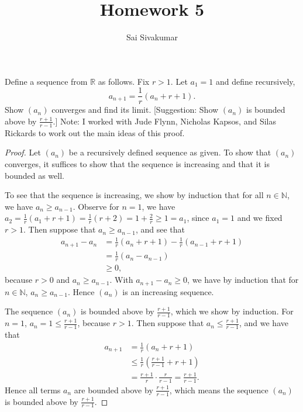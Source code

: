 \documentclass[12pt]{amsart}
\title{Homework 5}
\author{Sai Sivakumar}
\begin{document}
\maketitle

  Define a sequence from $\mathbb R$ as follows.
  Fix $r>1$. Let $a_1=1$ and define recursively, 
\[
  a_{n+1} = \frac{1}{r}(a_n +r +1).
\]
 Show $(a_n)$ converges and find its limit.
[Suggestion: Show $(a_n)$ is bounded above by $\frac{r+1}{r-1}.$]
Note: I worked with Jude Flynn, Nicholas Kapsos, and Silas Rickards to work out the main ideas of this proof.

\begin{proof}
    Let $(a_n)$ be a recursively defined sequence as given. To show that $(a_n)$ converges, it suffices to show that the sequence is increasing and that it is bounded as well.

    To see that the sequence is increasing, we show by induction that for all $n\in\mathbb{N}$, we have $a_{n} \geq a_{n-1}$. Observe for $n=1$, we have $a_2 = \frac{1}{r}(a_1 +r+1) = \frac{1}{r}(r+2) = 1 + \frac{2}{r} \geq 1 = a_1$, since $a_1 = 1$ and we fixed $r>1$. Then suppose that $a_n \geq a_{n-1}$, and see that \begin{align*}
        a_{n+1} - a_n &= \frac{1}{r}(a_n+r+1) - \frac{1}{r}(a_{n-1}+r+1) \\
        &= \frac{1}{r}(a_n-a_{n-1}) \\
        &\geq 0,
    \end{align*} because $r>0$ and $a_n \geq a_{n-1}$. With $a_{n+1} - a_n\geq 0$, we have by induction that for $n\in \mathbb{N}$, $a_{n} \geq a_{n-1}$. Hence $(a_n)$ is an increasing sequence.

    The sequence $(a_n)$ is bounded above by $\frac{r+1}{r-1}$, which we show by induction. For $n=1$, $a_n = 1 \leq \frac{r+1}{r-1}$, because $r>1$. Then suppose that $a_n \leq \frac{r+1}{r-1}$, and we have that \begin{align*}
        a_{n+1} &= \frac{1}{r}(a_n+r+1) \\
        &\leq \frac{1}{r}\left(\frac{r+1}{r-1} + r+ 1\right) \\
        &= \frac{r+1}{r}\cdot \frac{r}{r-1} = \frac{r+1}{r-1}.
    \end{align*} Hence all terms $a_n$ are bounded above by $\frac{r+1}{r-1}$, which means the sequence $(a_n)$ is bounded above by $\frac{r+1}{r-1}$. 


\end{proof}
\end{document}
